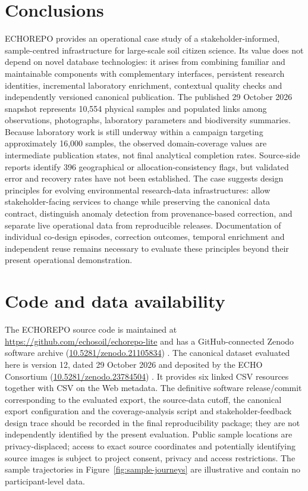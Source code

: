 \documentclass[11pt,a4paper]{article}
\begin{document}
\section{Conclusions}
ECHOREPO provides an operational case study of a stakeholder-informed, sample-centred infrastructure for large-scale soil citizen science. Its value does not depend on novel database technologies: it arises from combining familiar and maintainable components with complementary interfaces, persistent research identities, incremental laboratory enrichment, contextual quality checks and independently versioned canonical publication. The published 29 October 2026 snapshot represents 10,554 physical samples and populated links among observations, photographs, laboratory parameters and biodiversity summaries. Because laboratory work is still underway within a campaign targeting approximately 16,000 samples, the observed domain-coverage values are intermediate publication states, not final analytical completion rates. Source-side reports identify 396 geographical or allocation-consistency flags, but validated error and recovery rates have not been established. The case suggests design principles for evolving environmental research-data infrastructures: allow stakeholder-facing services to change while preserving the canonical data contract, distinguish anomaly detection from provenance-based correction, and separate live operational data from reproducible releases. Documentation of individual co-design episodes, correction outcomes, temporal enrichment and independent reuse remains necessary to evaluate these principles beyond their present operational demonstration.

\section{Code and data availability}
The ECHOREPO source code is maintained at \url{https://github.com/echosoil/echorepo-lite} and has a GitHub-connected Zenodo software archive (\href{https://doi.org/10.5281/zenodo.21105834}{10.5281/zenodo.21105834}) \parencite{echorepo2026software}. The canonical dataset evaluated here is version 12, dated 29 October 2026 and deposited by the ECHO Consortium (\href{https://doi.org/10.5281/zenodo.23784504}{10.5281/zenodo.23784504}) \parencite{echorepo2026dataset}. It provides six linked CSV resources together with CSV on the Web metadata. The definitive software release/commit corresponding to the evaluated export, the source-data cutoff, the canonical export configuration and the coverage-analysis script and stakeholder-feedback design trace should be recorded in the final reproducibility package; they are not independently identified by the present evaluation. Public sample locations are privacy-displaced; access to exact source coordinates and potentially identifying source images is subject to project consent, privacy and access restrictions. The sample trajectories in Figure~\ref{fig:sample-journeys} are illustrative and contain no participant-level data.

\printbibliography
\end{document}
